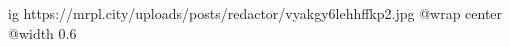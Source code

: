  
 
 
 
 

\ifcmt
  ig https://mrpl.city/uploads/posts/redactor/vyakgy6lehhffkp2.jpg
  @wrap center
  @width 0.6
\fi

